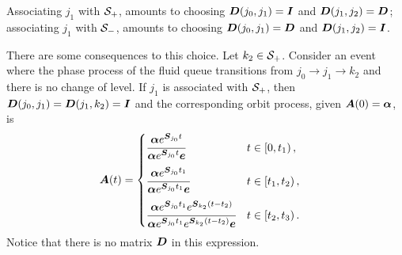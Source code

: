 
Associating \({j_1}\) with \(\mathcal{S}_+\), amounts to choosing \(\boldsymbol{D}({j_0},{j_1})=\boldsymbol{I}\) and \(\boldsymbol{D}({j_1},{j_2})=\boldsymbol{D}\); associating \({j_1}\) with \(\mathcal{S}_-\), amounts to choosing \(\boldsymbol{D}({j_0},{j_1})=\boldsymbol{D}\) and \(\boldsymbol{D}({j_1},{j_2})=\boldsymbol{I}\). 

There are some consequences to this choice. Let \(k_2\in \mathcal{S}_+\). Consider an event where the phase process of the fluid queue transitions from \({j_0}\to {j_1}\to k_2\) and there is no change of level. If \({j_1}\) is associated with \(\mathcal{S}_+\), then \(\boldsymbol{D}({j_0},{j_1})=\boldsymbol{D}({j_1},k_2)=\boldsymbol{I}\) and the corresponding orbit process, given \(\boldsymbol A(0) = \boldsymbol \alpha\), is 
\begin{align*}
\boldsymbol A(t) &= \begin{cases} 
	\cfrac{\boldsymbol \alpha e^{\boldsymbol{S}_{j_0}t}}{\boldsymbol \alpha e^{\boldsymbol{S}_{{j_0}}t}\boldsymbol e} & t\in\left[0,t_1\right), \\[10pt]
	\cfrac{\boldsymbol \alpha e^{\boldsymbol{S}_{j_0}t_1}}{\boldsymbol \alpha e^{\boldsymbol{S}_{j_0}t_1}\boldsymbol e} & t\in\left[t_1,t_2\right), \\[10pt] 
	\cfrac{\boldsymbol \alpha e^{\boldsymbol{S}_{j_0}t_1}e^{\boldsymbol{S}_{k_2}(t-t_2)}}{\boldsymbol \alpha e^{\boldsymbol{S}_{j_0}t_1}e^{\boldsymbol{S}_{k_2}(t-t_2)}\boldsymbol e} & t\in\left[t_2,t_3\right).
\end{cases}
\end{align*}
Notice that there is no matrix \(\boldsymbol D\) in this expression. 


